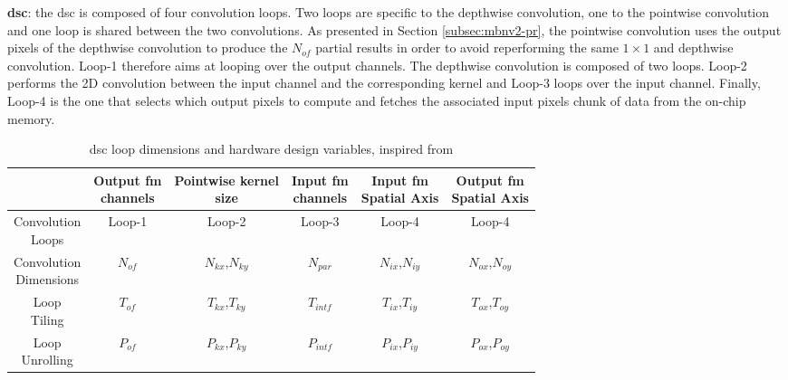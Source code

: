 %
\textbf{\acrshort{dsc}}: the \acrshort{dsc} is composed of four convolution loops. Two loops are specific to the depthwise convolution, one to the pointwise convolution and one loop is shared between the two convolutions. As presented in Section \ref{subsec:mbnv2-pr}, the pointwise convolution uses the output pixels of the depthwise convolution to produce the $N_{of}$ partial results in order to avoid reperforming the same $1 \times 1$ and depthwise convolution. Loop-1 therefore aims at looping over the output channels. The depthwise convolution is composed of two loops. Loop-2 performs the 2D convolution between the input channel and the corresponding kernel and Loop-3 loops over the input channel. Finally, Loop-4 is the one that selects which output pixels to compute and fetches the associated input pixels chunk of data from the on-chip memory.
%
\begin{table}[H]
    \centering
    \begin{tabular}{c|c|c|c|c|c}
    \hline \hline
    & \makecell{Output \acrshort{fm} \\ channels} & \makecell{Pointwise kernel \\ size} & \makecell{Input \acrshort{fm} \\ channels} & \makecell{Input \acrshort{fm} \\ Spatial Axis} & \makecell{Output \acrshort{fm} \\ Spatial Axis} \\
    \hline
    \makecell{Convolution \\ Loops}     & Loop-1   & Loop-2            & Loop-3     & Loop-4            & Loop-4 \\
    \makecell{Convolution \\ Dimensions}  & $N_{of}$ & $N_{kx}$,$N_{ky}$ & $N_{par}$  & $N_{ix}$,$N_{iy}$ & $N_{ox}$,$N_{oy}$\\
    \makecell{Loop \\ Tiling}          & $T_{of}$ & $T_{kx}$,$T_{ky}$ & $T_{intf}$ & $T_{ix}$,$T_{iy}$ & $T_{ox}$,$T_{oy}$\\
    \makecell{Loop \\ Unrolling}          & $P_{of}$ & $P_{kx}$,$P_{ky}$ & $P_{intf}$ & $P_{ix}$,$P_{iy}$ & $P_{ox}$,$P_{oy}$\\
    \hline \hline
    \end{tabular}
    \caption{\acrshort{dsc} loop dimensions and hardware design variables, inspired from \cite{ma_optimizing_2018}}
    \label{tab:param_dsc}
\end{table}
%

